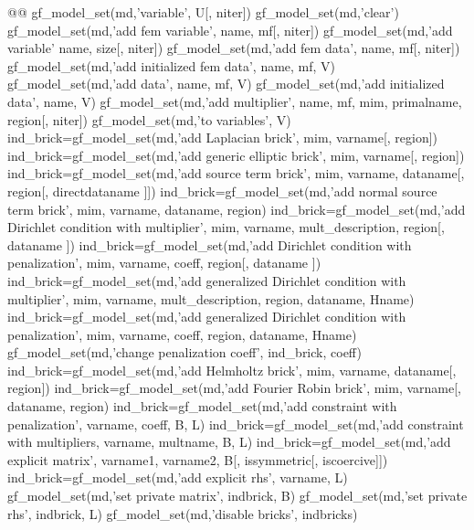 \begin{synopsis}
@@
gf_model_set(md,'variable', \tvec U[, \tint niter])
gf_model_set(md,'clear')
gf_model_set(md,'add fem variable', \tstr name, \tmf mf[, \tint niter])
gf_model_set(md,'add variable' \tstr name, \tint size[, \tint niter])
gf_model_set(md,'add fem data', \tstr name, \tmf mf[, \tint niter])
gf_model_set(md,'add initialized fem data', \tstr name, \tmf mf, \tvec V)
gf_model_set(md,'add data', \tstr name, \tmf mf, \tvec V)
gf_model_set(md,'add initialized data', \tstr name, \tvec V)
gf_model_set(md,'add multiplier', \tstr name, \tmf mf, \tmim mim, \tstr primalname, \tint region[, \tint niter])
gf_model_set(md,'to variables', \tvec V)
ind_brick=gf_model_set(md,'add Laplacian brick', \tmim mim, \tstr varname[, \tint region])
ind_brick=gf_model_set(md,'add generic elliptic brick', \tmim mim, \tstr varname[, \tint region])
ind_brick=gf_model_set(md,'add source term brick', \tmim mim, \tstr varname, \tstr dataname[, \tint region[, \tstr directdataname ]])
ind_brick=gf_model_set(md,'add normal source term brick', \tmim mim, \tstr varname, \tstr dataname, \tint region)
ind_brick=gf_model_set(md,'add Dirichlet condition with multiplier', \tmim mim, \tstr varname, mult_description, \tint region[, \tstr dataname ])
ind_brick=gf_model_set(md,'add Dirichlet condition with penalization', \tmim mim, \tstr varname, \tscal coeff, \tint region[, \tstr dataname ])
ind_brick=gf_model_set(md,'add generalized Dirichlet condition with multiplier', \tmim mim, \tstr varname, mult_description, \tint region, \tstr dataname, \tstr Hname)
ind_brick=gf_model_set(md,'add generalized Dirichlet condition with penalization', \tmim mim, \tstr varname, \tscal coeff, \tint region, \tstr dataname, \tstr Hname)
gf_model_set(md,'change penalization coeff', \tint ind_brick, \tscal coeff)
ind_brick=gf_model_set(md,'add Helmholtz brick', \tmim mim, \tstr varname, \tstr dataname[, \tint region])
ind_brick=gf_model_set(md,'add Fourier Robin brick', \tmim mim, \tstr varname[, \tstr dataname, \tint region)
ind_brick=gf_model_set(md,'add constraint with penalization',  \tstr varname, \tscal coeff, \tmat B, \tvec L)
ind_brick=gf_model_set(md,'add constraint with multipliers,  \tstr varname, \tstr multname, \tmat B, \tvec L)
ind_brick=gf_model_set(md,'add explicit matrix', \tstr varname1, \tstr varname2, \tmat B[, \tint issymmetric[, \tint iscoercive]])
ind_brick=gf_model_set(md,'add explicit rhs', \tstr varname, \tvec L)
gf_model_set(md,'set private matrix',  \tint indbrick, \tmat B)
gf_model_set(md,'set private rhs',  \tint indbrick, \tvec L)
gf_model_set(md,'disable bricks',  \tivec indbricks)

\end{synopsis}
